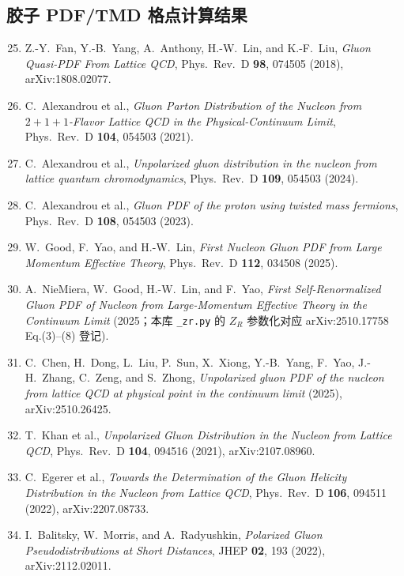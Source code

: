 \documentclass[11pt,a4paper]{ctexart}
\newcommand{\code}[1]{\texttt{#1}}
\begin{document}
\subsection*{胶子 PDF/TMD 格点计算结果}
\begin{enumerate}\setcounter{enumi}{24}
  \item Z.-Y.~Fan, Y.-B.~Yang, A.~Anthony, H.-W.~Lin, and K.-F.~Liu,
  \textit{Gluon Quasi-PDF From Lattice QCD}, Phys.\ Rev.\ D \textbf{98},
  074505 (2018), arXiv:1808.02077.
  \item C.~Alexandrou et al., \textit{Gluon Parton Distribution of the
  Nucleon from $2+1+1$-Flavor Lattice QCD in the Physical-Continuum
  Limit}, Phys.\ Rev.\ D \textbf{104}, 054503 (2021).
  \item C.~Alexandrou et al., \textit{Unpolarized gluon distribution in
  the nucleon from lattice quantum chromodynamics}, Phys.\ Rev.\ D
  \textbf{109}, 054503 (2024).
  \item C.~Alexandrou et al., \textit{Gluon PDF of the proton using
  twisted mass fermions}, Phys.\ Rev.\ D \textbf{108}, 054503 (2023).
  \item W.~Good, F.~Yao, and H.-W.~Lin, \textit{First Nucleon Gluon PDF
  from Large Momentum Effective Theory}, Phys.\ Rev.\ D \textbf{112},
  034508 (2025).
  \item A.~NieMiera, W.~Good, H.-W.~Lin, and F.~Yao, \textit{First
  Self-Renormalized Gluon PDF of Nucleon from Large-Momentum Effective
  Theory in the Continuum Limit} (2025；本库 \code{\_zr.py} 的
  $Z_R$ 参数化对应 arXiv:2510.17758 Eq.(3)--(8) 登记).
  \item C.~Chen, H.~Dong, L.~Liu, P.~Sun, X.~Xiong, Y.-B.~Yang, F.~Yao,
  J.-H.~Zhang, C.~Zeng, and S.~Zhong, \textit{Unpolarized gluon PDF of
  the nucleon from lattice QCD at physical point in the continuum
  limit} (2025), arXiv:2510.26425.
  \item T.~Khan et al., \textit{Unpolarized Gluon Distribution in the
  Nucleon from Lattice QCD}, Phys.\ Rev.\ D \textbf{104}, 094516 (2021),
  arXiv:2107.08960.
  \item C.~Egerer et al., \textit{Towards the Determination of the
  Gluon Helicity Distribution in the Nucleon from Lattice QCD},
  Phys.\ Rev.\ D \textbf{106}, 094511 (2022), arXiv:2207.08733.
  \item I.~Balitsky, W.~Morris, and A.~Radyushkin, \textit{Polarized
  Gluon Pseudodistributions at Short Distances}, JHEP \textbf{02}, 193
  (2022), arXiv:2112.02011.
\end{enumerate}
\end{document}

